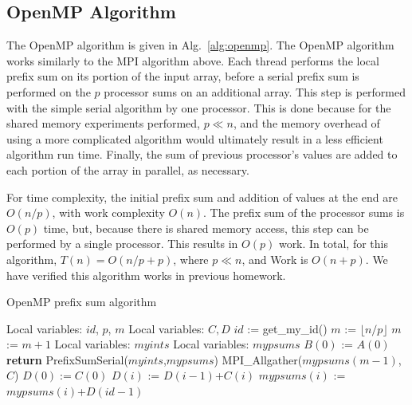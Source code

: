 \documentclass[12pt]{article}
\renewcommand{\SS}{\State}
\begin{document}
{{{\subsection{OpenMP Algorithm}

The OpenMP algorithm is given in Alg.~\ref{alg:openmp}.  The OpenMP algorithm works similarly to the MPI algorithm above.  Each thread performs the
local prefix sum on its portion of the input array, before a serial prefix sum is
performed on the $p$ processor sums on an additional array.  This step is performed
with the simple serial algorithm by one processor.  This is done because for the
shared memory experiments performed, $p\ll n$, and the memory overhead of using a more
complicated algorithm would ultimately result in a less efficient algorithm run time.  Finally, the sum of previous processor's values are added
to each portion of the array in parallel, as necessary.  

For time complexity, the initial prefix sum and addition of values at the end are
$O(n/p)$, with work complexity $O(n)$.  The prefix sum of the processor sums is
$O(p)$ time, but, because there is shared memory access, this step can be performed
by a single processor.  This results in $O(p)$ work.  In total, for this algorithm,
$T(n)=O(n/p+p)$, where $p\ll n$, and Work is $O(n+p)$. We have verified this
algorithm works in previous homework.

\begin{algorithm}
\begin{algorithmic}
    \caption{OpenMP prefix sum algorithm\label{alg:openmp}}
 
    \State {}
    \State Local variables: $id$, $p$, $m$ 
    \State Local variables: $C,D$ 
    \State $id$ := get\_my\_id() 
    \State $m$ := $\lfloor n/p \rfloor$ 
    \State $m$ :=  $m+1$
    \EndIf
    \State Local variables: $myints$ 
    \State Local variables: $mypsums$ 
        \SS $B(0)$ := $A(0)$
        \SS \textbf{return}
    \Else
        \SS PrefixSumSerial($myints$,$mypsums$)
    \EndIf
    \State MPI\_Allgather($mypsums(m-1)$,$C$) 
    $D(0) := C(0)$
     
        \State $D(i)$ := $D(i-1)$+$C(i)$
    \EndFor
            \SS $mypsums(i)$ := $mypsums(i)$+$D(id-1)$
        \EndFor
    \EndIf {}
\EndProcedure
\end{algorithmic}
\end{algorithm}

}}}
\end{document}

